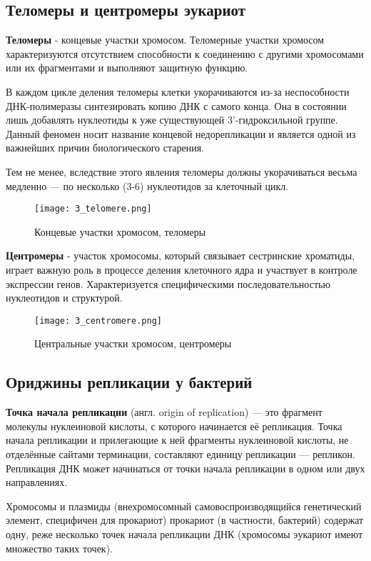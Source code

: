 \subsection{Теломеры и центромеры эукариот}
\textbf{Теломеры} - концевые участки хромосом. Теломерные участки хромосом характеризуются отсутствием способности к соединению с другими хромосомами или их фрагментами и выполняют защитную функцию. 

В каждом цикле деления теломеры клетки укорачиваются из-за неспособности ДНК-полимеразы синтезировать копию ДНК с самого конца. Она в состоянии лишь добавлять нуклеотиды к уже существующей 3’-гидроксильной группе. Данный феномен носит название концевой недорепликации и является одной из важнейших причин биологического старения.

Тем не менее, вследствие этого явления теломеры должны укорачиваться весьма медленно — по несколько (3-6) нуклеотидов за клеточный цикл.

\begin{figure}[H]
    \centering
    \texttt{[image: 3\_telomere.png]}
    \caption{Концевые участки хромосом, теломеры}
    \label{fig:3_telomere}
\end{figure}

\textbf{Центромеры} - участок хромосомы, который связывает сестринские хроматиды, играет важную роль в процессе деления клеточного ядра и участвует в контроле экспрессии генов. Характеризуется специфическими последовательностью нуклеотидов и структурой.

\begin{figure}[H]
    \centering
    \texttt{[image: 3\_centromere.png]}
    \caption{Центральные участки хромосом, центромеры}
    \label{fig:3_centromere}
\end{figure}

\subsection{Ориджины репликации у бактерий}
\textbf{Точка начала репликации} (англ. origin of replication) — это фрагмент молекулы нуклеиновой кислоты, с которого начинается её репликация. Точка начала репликации и прилегающие к ней фрагменты нуклеиновой кислоты, не отделённые сайтами терминации, составляют единицу репликации — репликон. Репликация ДНК может начинаться от точки начала репликации в одном или двух направлениях.

Хромосомы и плазмиды (внехромосомный самовоспроизводящийся генетический элемент, специфичен для прокариот) прокариот (в частности, бактерий) содержат одну, реже несколько точек начала репликации ДНК (хромосомы эукариот имеют множество таких точек).

